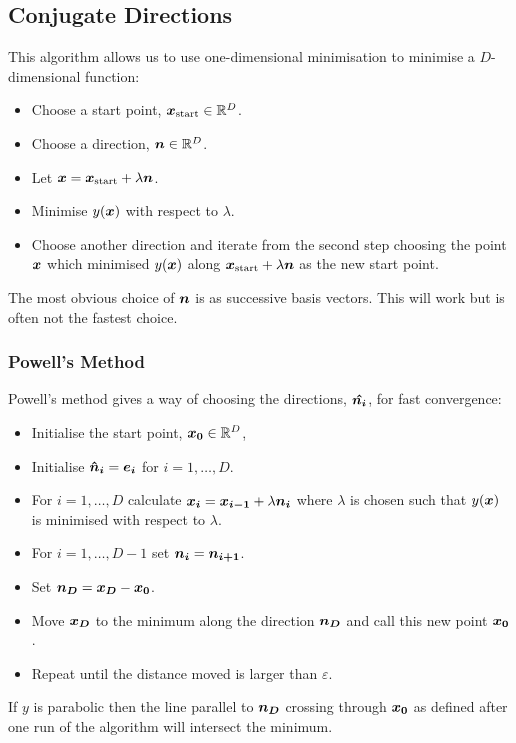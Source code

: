 \documentclass[a4paper]{article}
\begin{document}
    \subsection{Conjugate Directions}
    This algorithm allows us to use one-dimensional minimisation to minimise a \(D\)-dimensional function:
    \begin{itemize}
        \item Choose a start point, \(\bm{x_\text{start}}\in\mathbb{R}^D\).
        \item Choose a direction, \(\bm{n}\in\mathbb{R}^D\).
        \item Let \(\bm{x} = \bm{x_\text{start}} + \lambda\bm{n}\).
        \item Minimise \(y(\bm{x})\) with respect to \(\lambda\).
        \item Choose another direction and iterate from the second step choosing the point \(\bm{x}\) which minimised \(y(\bm{x})\) along \(\bm{x_\text{start}} + \lambda\bm{n}\) as the new start point.
    \end{itemize}
    The most obvious choice of \(\bm{n}\) is as successive basis vectors.
    This will work but is often not the fastest choice.
    
    \subsubsection{Powell's Method}
    Powell's method gives a way of choosing the directions, \(\bm{\hat{n_i}}\), for fast convergence:
    \begin{itemize}
        \item Initialise the start point, \(\bm{x_0}\in\mathbb{R}^D\),
        \item Initialise \(\bm{\hat{n}}\bm{_i} = \bm{e_{i}}\) for \(i = 1, \dotsc, D\).
        \item For \(i = 1, \dotsc, D\) calculate \(\bm{x_i} = \bm{x_{i-1}} + \lambda\bm{n_i}\) where \(\lambda\) is chosen such that \(y(\bm{x})\) is minimised with respect to \(\lambda\).
        \item For \(i = 1, \dotsc, D-1\) set \(\bm{n_i} = \bm{n_{i+1}}\).
        \item Set \(\bm{n_D} = \bm{x_D} - \bm{x_0}\).
        \item Move \(\bm{x_D}\) to the minimum along the direction \(\bm{n_D}\) and call this new point \(\bm{x_0}\).
        \item Repeat until the distance moved is larger than \(\varepsilon\).
    \end{itemize}
    If \(y\) is parabolic then the line parallel to \(\bm{n_D}\) crossing through \(\bm{x_0}\) as defined after one run of the algorithm will intersect the minimum.
    
\end{document}
